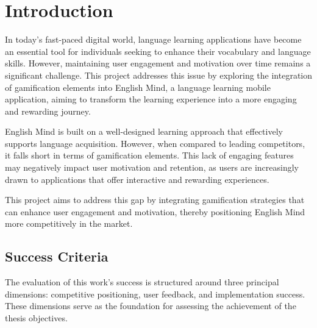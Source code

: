 \chapter{Introduction}

In today's fast-paced digital world, language learning applications have become an essential tool for individuals seeking to enhance their vocabulary and language skills. However, maintaining user engagement and motivation over time remains a significant challenge. This project addresses this issue by exploring the integration of gamification elements into English Mind, a language learning mobile application, aiming to transform the learning experience into a more engaging and rewarding journey.

English Mind is built on a well-designed learning approach that effectively supports language acquisition. However, when compared to leading competitors, it falls short in terms of gamification elements. This lack of engaging features may negatively impact user motivation and retention, as users are increasingly drawn to applications that offer interactive and rewarding experiences. 

This project aims to address this gap by integrating gamification strategies that can enhance user engagement and motivation, thereby positioning English Mind more competitively in the market.

\newpage

\section{Success Criteria}
\label{sec:success-criteria}

The evaluation of this work's success is structured around three principal dimensions: competitive positioning, user feedback, and implementation success. These dimensions serve as the foundation for assessing the achievement of the thesis objectives.


